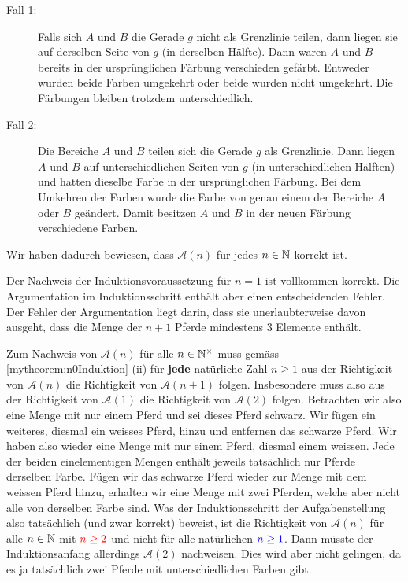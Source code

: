 \begin{myanswer}[myexercise:0207]
\begin{aenum}
\begin{renum}
\begin{enumerate}
				      \begin{description}
					      \item[Fall 1:] Falls sich $A$ und $B$ die Gerade $g$ nicht als Grenzlinie teilen, dann liegen sie auf derselben Seite von $g$ (in derselben Hälfte). Dann waren $A$ und $B$ bereits in der ursprünglichen Färbung verschieden gefärbt. Entweder wurden beide Farben umgekehrt oder beide wurden nicht umgekehrt. Die Färbungen bleiben trotzdem unterschiedlich.
					      \item[Fall 2:] Die Bereiche $A$ und $B$ teilen sich die Gerade $g$ als Grenzlinie. Dann liegen $A$ und $B$ auf unterschiedlichen Seiten von $g$ (in unterschiedlichen Hälften) und hatten dieselbe Farbe in der ursprünglichen Färbung. Bei dem Umkehren der Farben wurde die Farbe von genau einem der Bereiche $A$ oder $B$ geändert. Damit besitzen $A$ und $B$ in der neuen Färbung verschiedene Farben.
				      \end{description}
			\end{enumerate}
		\end{renum}
	\end{aenum}
	Wir haben dadurch bewiesen, dass $\mathcal{A}(n)$ für jedes $n\in\mathbb{N}$ korrekt ist.
\end{myanswer}

\begin{myanswer}[myexercise:0268]
	Der Nachweis der Induktionsvoraussetzung für $n=1$ ist vollkommen korrekt. Die Argumentation im Induktionsschritt enthält aber einen entscheidenden Fehler. Der Fehler der Argumentation liegt darin, dass sie unerlaubterweise davon ausgeht, dass die Menge der $n+1$ Pferde mindestens 3 Elemente enthält.

	Zum Nachweis von $\mathcal{A}(n)$ für alle $n\in\mathbb{N}^{\times}$ muss gemäss \cref{mytheorem:n0Induktion} (ii) für \textbf{jede} natürliche Zahl $n\geq 1$ aus der Richtigkeit von $\mathcal{A}(n)$ die Richtigkeit von $\mathcal{A}(n+1)$ folgen. Insbesondere muss also aus der Richtigkeit von $\mathcal{A}(1)$ die Richtigkeit von $\mathcal{A}(2)$ folgen. Betrachten wir also eine Menge mit nur einem Pferd und sei dieses Pferd schwarz. Wir fügen ein weiteres, diesmal ein weisses Pferd, hinzu und entfernen das schwarze Pferd. Wir haben also wieder eine Menge mit nur einem Pferd, diesmal einem weissen. Jede der beiden einelementigen Mengen enthält jeweils tatsächlich nur Pferde derselben Farbe. Fügen wir das schwarze Pferd wieder zur Menge mit dem weissen Pferd hinzu, erhalten wir eine Menge mit zwei Pferden, welche aber nicht alle von derselben Farbe sind. Was der Induktionsschritt der Aufgabenstellung also tatsächlich (und zwar korrekt) beweist, ist die Richtigkeit von $\mathcal{A}(n)$ für alle $n\in\mathbb{N}$ mit $\textcolor{Red}{n\geq 2}$ und nicht für alle natürlichen $\textcolor{Blue}{n\geq 1}$. Dann müsste der Induktionsanfang allerdings $\mathcal{A}(2)$ nachweisen. Dies wird aber nicht gelingen, da es ja tatsächlich zwei Pferde mit unterschiedlichen Farben gibt. \cite{Piotr}
\end{myanswer}

